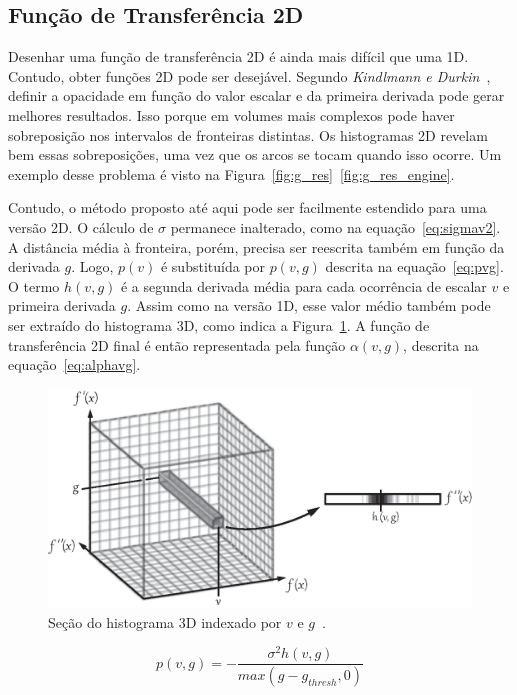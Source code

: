 \subsection{Função de Transferência 2D}
\label{subsec:gordon.2d}
    Desenhar uma função de transferência 2D é ainda mais difícil que uma 1D. Contudo, obter funções 2D pode ser desejável. Segundo \textit{Kindlmann e Durkin}~\cite{gordon}, definir a opacidade em função do valor escalar e da primeira derivada pode gerar melhores resultados. Isso porque em volumes mais complexos pode haver sobreposição nos intervalos de fronteiras distintas. Os histogramas 2D revelam bem essas sobreposições, uma vez que os arcos se tocam quando isso ocorre. Um exemplo desse problema é visto na Figura~\ref{fig:g_res}~\ref{fig:g_res_engine}.
    
    Contudo, o método proposto até aqui pode ser facilmente estendido para uma versão 2D. O cálculo de $\sigma$ permanece inalterado, como na equação~\eqref{eq:sigmav2}. A distância média à fronteira, porém, precisa ser reescrita também em função da derivada $g$. Logo, $p(v)$ é substituída por $p(v,g)$ descrita na equação~\eqref{eq:pvg}. O termo $h(v,g)$ é a segunda derivada média para cada ocorrência de escalar $v$ e primeira derivada $g$. Assim como na versão 1D, esse valor médio também pode ser extraído do histograma 3D, como indica a Figura~\ref{fig:g_hvg}. A função de transferência 2D final é então representada pela função $ \alpha(v, g) $, descrita na equação~\eqref{eq:alphavg}.
    
\begin{figure}[h]
	\centering
	\includegraphics[width=1\textwidth]{images/g_hvg}
	\caption{Seção do histograma 3D indexado por $ v $ e $ g $~\cite{gordonms}.}
	\label{fig:g_hvg}
\end{figure}
    
\begin{equation} \label{eq:pvg}
	p(v,g) = -\frac{\sigma^{2}h(v,g)}{max(g - g_{thresh}, 0)}
\end{equation} \\

